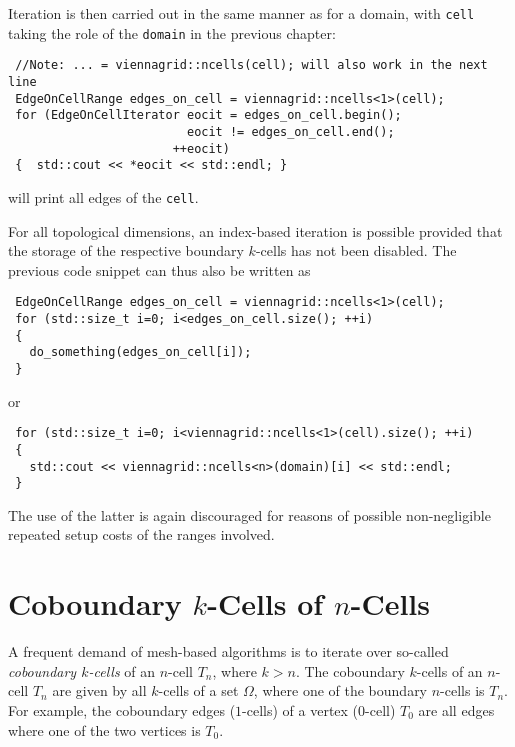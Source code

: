 Iteration is then carried out in the same manner as for a domain, with \lstinline|cell| taking the role of the \lstinline|domain| in the previous chapter:
\begin{lstlisting}
 //Note: ... = viennagrid::ncells(cell); will also work in the next line
 EdgeOnCellRange edges_on_cell = viennagrid::ncells<1>(cell);
 for (EdgeOnCellIterator eocit = edges_on_cell.begin();
                         eocit != edges_on_cell.end();
                       ++eocit)
 {  std::cout << *eocit << std::endl; } 
\end{lstlisting}
will print all edges of the \lstinline|cell|.

For all topological dimensions, an index-based iteration is possible provided that the storage of the respective boundary $k$-cells has not been disabled. The previous code snippet can thus also be written as
\begin{lstlisting}
 EdgeOnCellRange edges_on_cell = viennagrid::ncells<1>(cell);
 for (std::size_t i=0; i<edges_on_cell.size(); ++i)
 { 
   do_something(edges_on_cell[i]);
 }
\end{lstlisting}
or
\begin{lstlisting}
 for (std::size_t i=0; i<viennagrid::ncells<1>(cell).size(); ++i)
 {
   std::cout << viennagrid::ncells<n>(domain)[i] << std::endl;
 }
\end{lstlisting}
The use of the latter is again discouraged for reasons of possible non-negligible repeated setup costs of the ranges involved.





\section{Coboundary $k$-Cells of $n$-Cells}
A frequent demand of mesh-based algorithms is to iterate over so-called \emph{coboundary $k$-cells} of an $n$-cell $T_n$, where $k > n$.
The coboundary $k$-cells of an $n$-cell $T_n$ are given by all $k$-cells of a set $\Omega$, where one of the boundary $n$-cells is $T_n$.
For example, the coboundary edges ($1$-cells) of a vertex ($0$-cell) $T_0$ are all edges where one of the two vertices is $T_0$.

